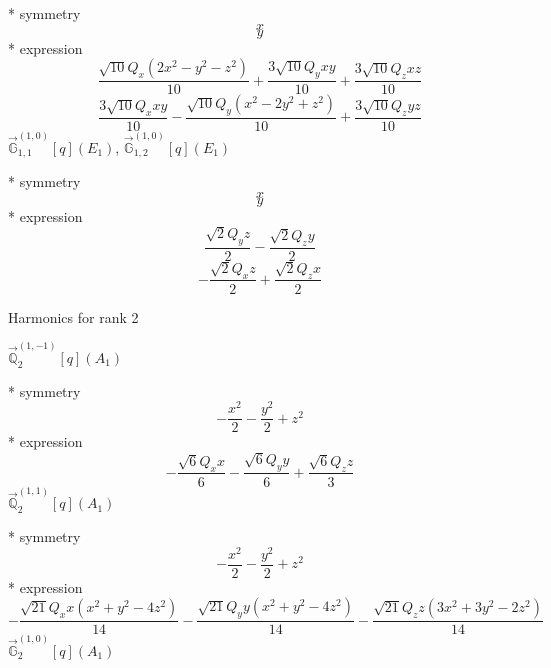 \documentclass[fleqn,8pt]{jsarticle}
\begin{document}
\noindent\quad ** symmetry
\begin{dmath*}
x
\end{dmath*}
\begin{dmath*}
y
\end{dmath*}
\noindent\quad ** expression
\begin{dmath*}
\frac{\sqrt{10} Q_{x} \left(2 x^{2} - y^{2} - z^{2}\right)}{10} + \frac{3 \sqrt{10} Q_{y} x y}{10} + \frac{3 \sqrt{10} Q_{z} x z}{10}
\end{dmath*}
\begin{dmath*}
\frac{3 \sqrt{10} Q_{x} x y}{10} - \frac{\sqrt{10} Q_{y} \left(x^{2} - 2 y^{2} + z^{2}\right)}{10} + \frac{3 \sqrt{10} Q_{z} y z}{10}
\end{dmath*}
\noindent\quad $\vec{\mathbb{G}}_{1,1}^{(1,0)}[q](E_{1})$, $\vec{\mathbb{G}}_{1,2}^{(1,0)}[q](E_{1})$

\noindent\quad ** symmetry
\begin{dmath*}
x
\end{dmath*}
\begin{dmath*}
y
\end{dmath*}
\noindent\quad ** expression
\begin{dmath*}
\frac{\sqrt{2} Q_{y} z}{2} - \frac{\sqrt{2} Q_{z} y}{2}
\end{dmath*}
\begin{dmath*}
- \frac{\sqrt{2} Q_{x} z}{2} + \frac{\sqrt{2} Q_{z} x}{2}
\end{dmath*}

\noindent * Harmonics for rank 2

\noindent\quad $\vec{\mathbb{Q}}_{2}^{(1,-1)}[q](A_{1})$

\noindent\quad ** symmetry
\begin{dmath*}
- \frac{x^{2}}{2} - \frac{y^{2}}{2} + z^{2}
\end{dmath*}
\noindent\quad ** expression
\begin{dmath*}
- \frac{\sqrt{6} Q_{x} x}{6} - \frac{\sqrt{6} Q_{y} y}{6} + \frac{\sqrt{6} Q_{z} z}{3}
\end{dmath*}
\noindent\quad $\vec{\mathbb{Q}}_{2}^{(1,1)}[q](A_{1})$

\noindent\quad ** symmetry
\begin{dmath*}
- \frac{x^{2}}{2} - \frac{y^{2}}{2} + z^{2}
\end{dmath*}
\noindent\quad ** expression
\begin{dmath*}
- \frac{\sqrt{21} Q_{x} x \left(x^{2} + y^{2} - 4 z^{2}\right)}{14} - \frac{\sqrt{21} Q_{y} y \left(x^{2} + y^{2} - 4 z^{2}\right)}{14} - \frac{\sqrt{21} Q_{z} z \left(3 x^{2} + 3 y^{2} - 2 z^{2}\right)}{14}
\end{dmath*}
\noindent\quad $\vec{\mathbb{G}}_{2}^{(1,0)}[q](A_{1})$
\end{document}
